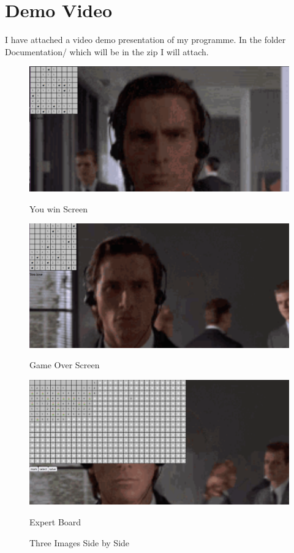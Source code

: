 \documentclass{article} %
\begin{document}
\section{Demo Video}
I have attached a video demo presentation of my programme. In the folder Documentation/ which will be in the zip I will attach.
\begin{figure}[h]
  \centering
  \begin{minipage}{0.3\textwidth}
    \centering
    \includegraphics[width=1.0\linewidth]{youwin}
    \caption{You win Screen}
  \end{minipage}
  \begin{minipage}{0.3\textwidth}
    \centering
    \includegraphics[width=1.0\linewidth]{gameover}
    \caption{Game Over Screen}
  \end{minipage}
  \begin{minipage}{0.3\textwidth}
    \centering
    \includegraphics[width=1.0\linewidth]{expertboard}
      \caption{Expert Board}
  \end{minipage}
  \caption{Three Images Side by Side}
  \label{fig:three_images}
\end{figure}
\end{document}
